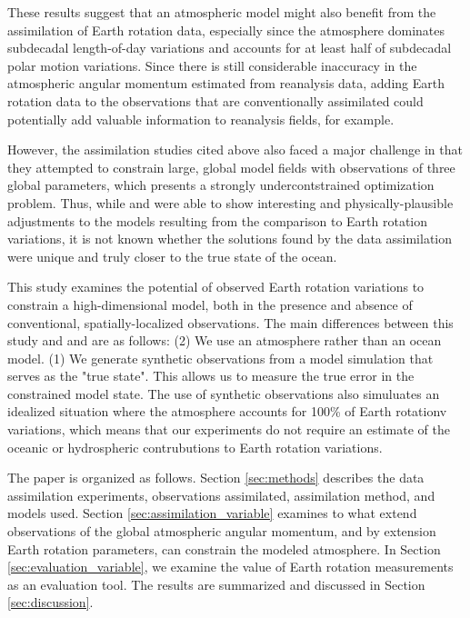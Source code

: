 These results suggest that an atmospheric model might also benefit from the assimilation of Earth rotation data, especially since the atmosphere dominates subdecadal length-of-day variations and accounts for at least half of subdecadal polar motion variations. 
Since there is still considerable inaccuracy in the atmospheric angular momentum estimated from reanalysis data, adding Earth rotation data to the observations that are conventionally assimilated could potentially add valuable information to reanalysis fields, for example. 

However, the assimilation studies cited above also faced a major challenge in that they attempted to constrain large, global model fields with observations of three global parameters, which presents a strongly undercontstrained optimization problem. 
Thus, while \citet{Saynisch2010,Saynisch2011} and \citet{Saynisch2012} were able to show interesting and physically-plausible adjustments to the models resulting from the comparison to Earth rotation variations, it is not known whether the solutions found by the data assimilation were unique and truly closer to the true state of the ocean.  

This study examines the potential of observed Earth rotation variations to constrain a high-dimensional model, both in the presence and absence of conventional, spatially-localized observations. 
The main differences between this study and \citet{Saynisch2010,Saynisch2011} and \citet{Saynisch2012} are as follows: 
(2) We use an atmosphere rather than an ocean model.
(1) We generate synthetic observations from a model simulation that serves as the "true state". This allows us to measure the true error in the constrained model state. The use of synthetic observations also simuluates an idealized situation where the atmosphere accounts for 100\% of Earth rotationv variations, which means that our experiments do not require an estimate of the oceanic or hydrospheric contrubutions to Earth rotation variations.  


The paper is organized as follows.  
Section \ref{sec:methods} describes the data assimilation experiments, observations assimilated, assimilation method, and models used.
Section \ref{sec:assimilation_variable} examines to what extend observations of the global atmospheric angular momentum, and by extension Earth rotation parameters, can constrain the modeled atmosphere. 
In Section \ref{sec:evaluation_variable}, we examine the value of Earth rotation measurements as an evaluation tool.  
The results are summarized and discussed in Section \ref{sec:discussion}.

